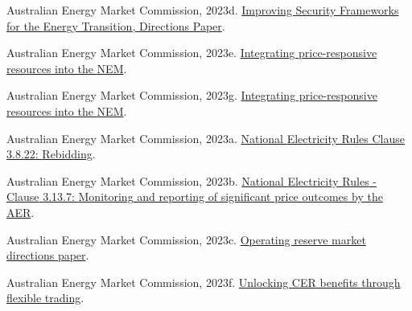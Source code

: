 \documentclass[12pt,a4paper,]{report}
\newlength{\cslhangindent}
\newenvironment{CSLReferences}[2] %
 {%
  \setlength{\parindent}{0pt}
  \ifodd #1 \everypar{\setlength{\hangindent}{\cslhangindent}}\ignorespaces\fi
  \ifnum #2 > 0
  \setlength{\parskip}{#2\baselineskip}
  \fi
 }%
 {}
\begin{document}
\begin{CSLReferences}{1}{0}
\leavevmode{}%
Australian Energy Market Commission, 2023d.
\href{https://www.aemc.gov.au/sites/default/files/2023-08/ERC0290\%20\%E2\%80\%93\%20Improving\%20security\%20frameworks\%20for\%20the\%20energy\%20transition.pdf}{Improving
{Security Frameworks} for the {Energy Transition}, {Directions Paper}}.

\leavevmode{}%
Australian Energy Market Commission, 2023e.
\href{https://www.aemc.gov.au/sites/default/files/2023-08/ERC0352\%20-\%20Integrating\%20price-responsive\%20resources\%20into\%20the\%20NEM\%20-\%20Consultation\%20paper.pdf}{Integrating
price-responsive resources into the {NEM}}.

\leavevmode{}%
Australian Energy Market Commission, 2023g.
\href{https://www.aemc.gov.au/sites/default/files/2023-12/ERC0352\%20-\%20Integrating\%20price-responsive\%20resources\%20into\%20the\%20NEM.pdf}{Integrating
price-responsive resources into the {NEM}}.

\leavevmode{}%
Australian Energy Market Commission, 2023a.
\href{https://energy-rules.aemc.gov.au/ner/477/272296\#3.8.22}{National
{Electricity Rules Clause} 3.8.22: {Rebidding}}.

\leavevmode{}%
Australian Energy Market Commission, 2023b.
\href{https://energy-rules.aemc.gov.au/ner/477/272353\#3.13.7}{National
{Electricity Rules} - {Clause} 3.13.7: {Monitoring} and reporting of
significant price outcomes by the {AER}}.

\leavevmode{}%
Australian Energy Market Commission, 2023c.
\href{https://www.aemc.gov.au/sites/default/files/2023-08/directions_paper_2023_0.pdf}{Operating
reserve market directions paper}.

\leavevmode{}%
Australian Energy Market Commission, 2023f.
\href{https://www.aemc.gov.au/sites/default/files/2023-08/ERC0346\%20CER\%20Benefits\%20Directions\%20paper\%20-\%20rule\%20change.pdf}{Unlocking
{CER} benefits through flexible trading}.


\end{CSLReferences}
\end{document}
